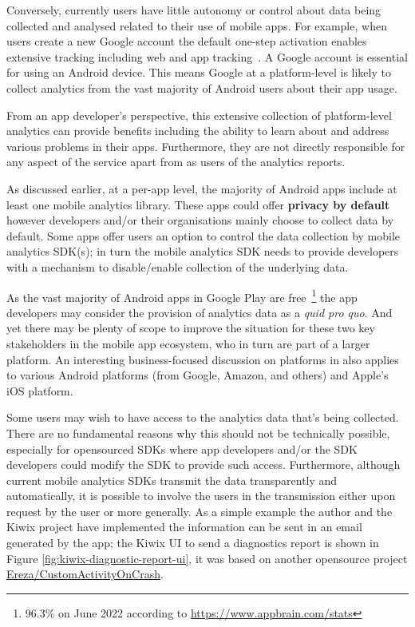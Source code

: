 Conversely, currently users have little autonomy or control about data being collected and analysed related to their use of mobile apps. For example, when users create a new Google account the default one-step activation enables extensive tracking including web and app tracking~. A Google account is essential for using an Android device. %
This means Google at a platform-level is likely to collect analytics from the vast majority of Android users about their app usage. 

From an app developer's perspective, this extensive collection of platform-level analytics can provide benefits including the ability to learn about and address various problems in their apps. Furthermore, they are not directly responsible for any aspect of the service apart from as users of the analytics reports.

As discussed earlier, at a per-app level, the majority of Android apps include at least one mobile analytics library. These apps could offer \textbf{privacy by default} however developers and/or their organisations mainly choose to collect data by default. Some apps offer users an option to control the data collection by mobile analytics SDK(s); in turn the mobile analytics SDK needs to  provide developers with a mechanism to disable/enable collection of the underlying data.

As the vast majority of Android apps in Google Play are free~\footnote{96.3\% on  June 2022 according to \url{https://www.appbrain.com/stats}} the app developers may consider the provision of analytics data as a \emph{quid pro quo}. And yet there may be plenty of scope to improve the situation for these two key stakeholders in the mobile app ecosystem, who in turn are part of a larger platform. An interesting business-focused discussion on platforms in  also applies to various Android platforms (from Google, Amazon, and others) and Apple's iOS platform.

Some users may wish to have access to the analytics data that's being collected. There are no fundamental reasons why this should not be technically possible, especially for opensourced SDKs where app developers and/or the SDK developers could modify the SDK to provide such access. Furthermore, although current mobile analytics SDKs transmit the data transparently and automatically, it is possible to involve the users in the transmission either upon request by the user or more generally. As a simple example the author and the Kiwix project have implemented the information can be sent in an email generated by the app; the Kiwix UI to send a diagnostics report is shown in Figure \ref{fig:kiwix-diagnostic-report-ui}, it was based on another opensource project \href{https://github.com/Ereza/CustomActivityOnCrash}{Ereza/CustomActivityOnCrash}. %


